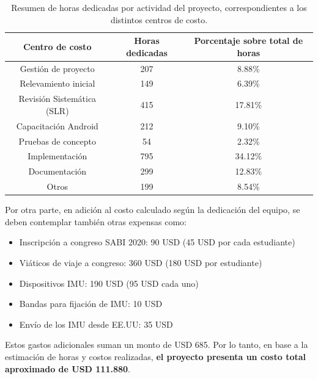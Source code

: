 \begin{table}[H]
\caption{Resumen de horas dedicadas por actividad del proyecto, correspondientes a los distintos centros de costo.}
\centering
\hspace*{-2.5cm}%
\begin{tabular}{|c|c|c|}
\hline
\textbf{Centro de costo} & \textbf{Horas dedicadas} & \textbf{Porcentaje sobre total de horas} \\ \hline
Gestión de proyecto & 207 & 8.88\% \\ \hline
Relevamiento inicial & 149 & 6.39\% \\ \hline
Revisión Sistemática (SLR) & 415 & 17.81\% \\ \hline
Capacitación Android & 212 & 9.10\% \\ \hline
Pruebas de concepto	& 54 & 2.32\% \\ \hline
Implementación & 795 & 34.12\% \\ \hline
Documentación & 299 & 12.83\% \\ \hline
Otros\footnotemark & 199 & 8.54\% \\ \hline
\end{tabular}
\hspace*{-1cm}
\label{TAB:dedication-per-center}
\end{table}


Por otra parte, en adición al costo calculado según la dedicación del equipo, se deben contemplar también otras expensas como: 

\begin{itemize}
    \item Inscripción a congreso SABI 2020: 90 USD (45 USD por cada estudiante)
    \item Viáticos de viaje a congreso: 360 USD (180 USD por estudiante)
    \item Dispositivos IMU: 190 USD (95 USD cada uno) 
    \item Bandas para fijación de IMU: 10 USD
    \item Envío de los IMU desde EE.UU: 35 USD
\end{itemize}

Estos gastos adicionales suman un monto de USD 685. Por lo tanto, en base a la estimación de horas y costos realizadas, \textbf{el proyecto presenta un costo total aproximado de USD 111.880}.

